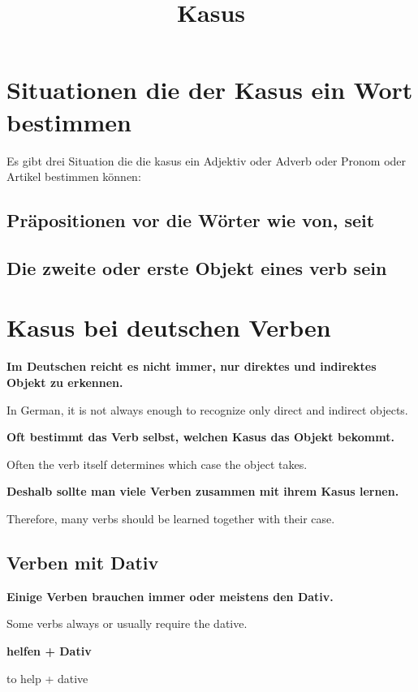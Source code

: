\documentclass[a4paper]{article}
\title{Kasus}
\date{}
\newcommand{\EN}[1]{\par{\small\textcolor{TranslationGray}{#1}}\vspace{0.4em}}
\begin{document}
    \maketitle
    
    
    \section{Situationen die der Kasus ein Wort bestimmen}
        Es gibt drei Situation die die kasus ein Adjektiv oder Adverb oder Pronom oder Artikel bestimmen können:
        
        \subsection{Präpositionen vor die Wörter wie von, seit }
        
        \subsection{Die zweite oder erste Objekt eines verb sein}
    
    
    \section{Kasus bei deutschen Verben}
        
        \textbf{Im Deutschen reicht es nicht immer, nur direktes und indirektes Objekt zu erkennen.}
        \EN{In German, it is not always enough to recognize only direct and indirect objects.}
        
        \textbf{Oft bestimmt das Verb selbst, welchen Kasus das Objekt bekommt.}
        \EN{Often the verb itself determines which case the object takes.}
        
        \textbf{Deshalb sollte man viele Verben zusammen mit ihrem Kasus lernen.}
        \EN{Therefore, many verbs should be learned together with their case.}
        
        \subsection{Verben mit Dativ}
            
            \textbf{Einige Verben brauchen immer oder meistens den Dativ.}
            \EN{Some verbs always or usually require the dative.}
            
            \textbf{helfen + Dativ}
            \EN{to help + dative}
            
\end{document}
